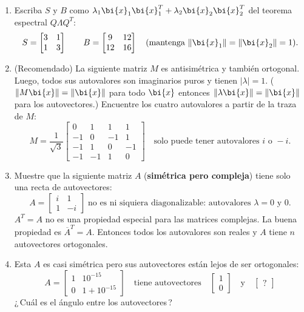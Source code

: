 \begin{enumerate}
\item Escriba $S$ y $B$ como $\lambda_1\bi{x}_1\bi{x}^T_1+\lambda_2 \bi{x}_2 \bi{x}^T_2$ del teorema espectral $Q\Lambda Q^T$:
\[
S = \begin{bmatrix} 3&1\\ 1&3\end{bmatrix} \qquad B =
\begin{bmatrix} 9&12\\ 12&16\end{bmatrix} \quad
\text{(mantenga } \|\bi{x}_1\|=\|\bi{x}_2\|=1\text{)}.
\]

\item (Recomendado) La siguiente matriz $M$ es antisimétrica y también ortogonal.
Luego, todos sus autovalores son imaginarios puros y tienen $|\lambda|=1$. ($\|M\bi{x}\|=\|\bi{x}\|$ para todo $\bi{x}$ entonces $\|\lambda\bi{x}\|=\|\bi{x}\|$ para los autovectores.) Encuentre los cuatro autovalores a partir de la traza de $M$:
\[
M = \frac{1}{\sqrt 3}\begin{bmatrix} 0 & 1 & 1 & 1\\
    -1 & 0 &  -1 & 1\\   -1 & 1 & 0
  &  -1\\   -1 &   -1 & 1 &
0\end{bmatrix}\quad \text{solo puede tener autovalores } i \text{ o } -i.
\]

\item Muestre que la siguiente matriz $A$ (\textbf{simétrica pero compleja}) tiene solo una recta de autovectores:
\[
A = \begin{bmatrix} i&1\\ 1&-i\end{bmatrix} \; \text{no es ni siquiera diagonalizable: autovalores } \lambda=0 \text{ y }0.
\]
$A^T =A$ no es una propiedad especial para las matrices complejas. La buena propiedad es $\overline{A}^T = A$.  Entonces todos los autovalores son reales y $A$ tiene $n$ autovectores ortogonales.

\item Esta $A$ es casi simétrica pero sus autovectores están lejos de ser ortogonales:
\[
A=\begin{bmatrix}1 & 10^{-15}\\
0 & 1+10^{-15}
\end{bmatrix}\quad \text{tiene autovectores}\quad
\begin{bmatrix}1\\0\end{bmatrix}\quad \text{y}\quad
\begin{bmatrix}?\end{bmatrix}
\]
¿\,Cuál es el ángulo entre los autovectores\,?


\end{enumerate}
